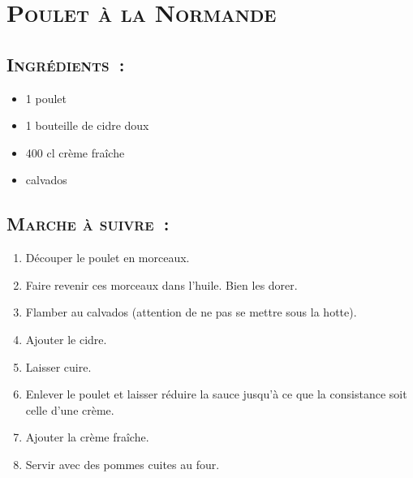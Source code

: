 \section[\normalsize{Poulet \`a la Normande}]{\LARGE{\textsc{Poulet \`a la Normande}}}



\subsection*{\textsc{Ingr\'edients~:}}
\begin{itemize}
\item 1 poulet
\item 1 bouteille de cidre doux
\item	400 cl crème fraîche
\item	calvados
\end{itemize}


\subsection*{\textsc{Marche \`a suivre~:}}
\begin{enumerate}
\item D\'ecouper le poulet en morceaux.
\item Faire revenir ces morceaux dans l’huile.
Bien les dorer.
\item Flamber au calvados (attention de ne pas se mettre sous la hotte).
\item Ajouter le cidre.
\item Laisser cuire.
\item Enlever le poulet et laisser r\'eduire la sauce jusqu’\`a ce que la consistance soit celle d’une cr\`eme.
\item Ajouter la cr\`eme fra\^iche.
\item Servir avec des pommes cuites au four. 
\end{enumerate}